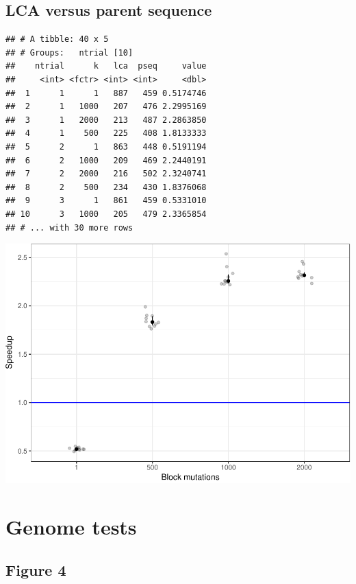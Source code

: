 \documentclass[]{article}
\begin{document}
\subsection{LCA versus parent
sequence}\label{lca-versus-parent-sequence}

\begin{verbatim}
## # A tibble: 40 x 5
## # Groups:   ntrial [10]
##    ntrial      k   lca  pseq     value
##     <int> <fctr> <int> <int>     <dbl>
##  1      1      1   887   459 0.5174746
##  2      1   1000   207   476 2.2995169
##  3      1   2000   213   487 2.2863850
##  4      1    500   225   408 1.8133333
##  5      2      1   863   448 0.5191194
##  6      2   1000   209   469 2.2440191
##  7      2   2000   216   502 2.3240741
##  8      2    500   234   430 1.8376068
##  9      3      1   861   459 0.5331010
## 10      3   1000   205   479 2.3365854
## # ... with 30 more rows
\end{verbatim}

\includegraphics{sea_2018_files/figure-latex/unnamed-chunk-2-1.pdf}

\section{Genome tests}\label{genome-tests}

\subsection{Figure 4}\label{figure-4}
\end{document}
